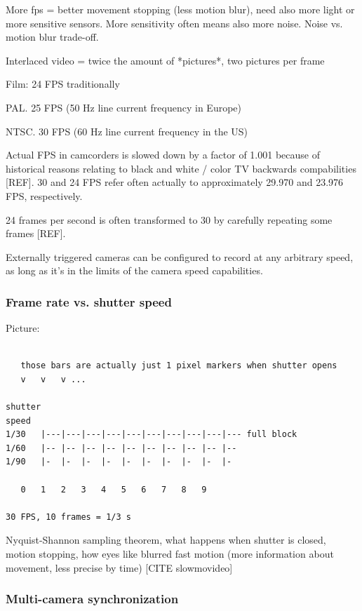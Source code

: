 More fps = better movement stopping (less motion blur), need also more light or more sensitive sensors. More sensitivity often means also more noise. Noise vs. motion blur trade-off.

Interlaced video = twice the amount of *pictures*, two pictures per frame

Film: 24 FPS traditionally

PAL. 25 FPS (50 Hz line current frequency in Europe)

NTSC. 30 FPS (60 Hz line current frequency in the US)

Actual FPS in camcorders is slowed down by a factor of 1.001 because of historical reasons relating to black and white / color TV backwards compabilities [REF].
30 and 24 FPS refer often actually to approximately 29.970 and 23.976 FPS, respectively.

24 frames per second is often transformed to 30 by carefully repeating some frames [REF].

Externally triggered cameras can be configured to record at any arbitrary speed, as long as it's in the limits of the camera speed capabilities.

\subsubsection{Frame rate vs. shutter speed}

Picture:

\begin{verbatim}

   those bars are actually just 1 pixel markers when shutter opens
   v   v   v ...

shutter
speed
1/30   |---|---|---|---|---|---|---|---|---|--- full block
1/60   |-- |-- |-- |-- |-- |-- |-- |-- |-- |--
1/90   |-  |-  |-  |-  |-  |-  |-  |-  |-  |-

   0   1   2   3   4   5   6   7   8   9

30 FPS, 10 frames = 1/3 s
\end{verbatim}

Nyquist-Shannon sampling theorem, what happens when shutter is closed, motion stopping, how eyes like blurred fast motion (more information about movement, less precise by time) [CITE slowmovideo]

\subsubsection{Multi-camera synchronization}

